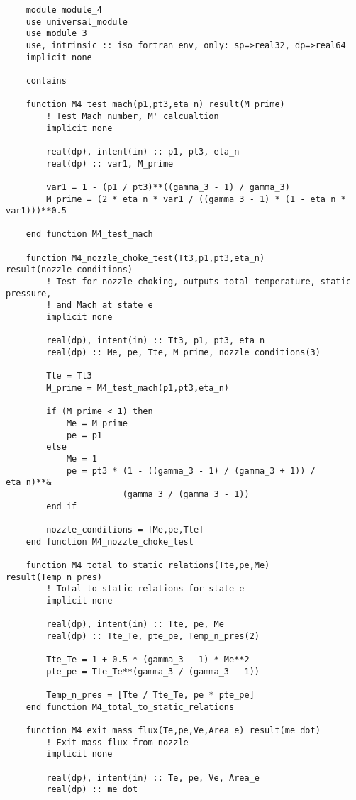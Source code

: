 \begin{verbatim}
    module module_4
    use universal_module
    use module_3
    use, intrinsic :: iso_fortran_env, only: sp=>real32, dp=>real64
    implicit none

    contains

    function M4_test_mach(p1,pt3,eta_n) result(M_prime)
        ! Test Mach number, M' calcualtion
        implicit none

        real(dp), intent(in) :: p1, pt3, eta_n
        real(dp) :: var1, M_prime

        var1 = 1 - (p1 / pt3)**((gamma_3 - 1) / gamma_3)
        M_prime = (2 * eta_n * var1 / ((gamma_3 - 1) * (1 - eta_n * var1)))**0.5

    end function M4_test_mach

    function M4_nozzle_choke_test(Tt3,p1,pt3,eta_n) result(nozzle_conditions)
        ! Test for nozzle choking, outputs total temperature, static pressure,
        ! and Mach at state e
        implicit none

        real(dp), intent(in) :: Tt3, p1, pt3, eta_n
        real(dp) :: Me, pe, Tte, M_prime, nozzle_conditions(3)

        Tte = Tt3
        M_prime = M4_test_mach(p1,pt3,eta_n)

        if (M_prime < 1) then
            Me = M_prime
            pe = p1
        else
            Me = 1
            pe = pt3 * (1 - ((gamma_3 - 1) / (gamma_3 + 1)) / eta_n)**& 
                       (gamma_3 / (gamma_3 - 1))
        end if

        nozzle_conditions = [Me,pe,Tte]
    end function M4_nozzle_choke_test

    function M4_total_to_static_relations(Tte,pe,Me) result(Temp_n_pres)
        ! Total to static relations for state e
        implicit none

        real(dp), intent(in) :: Tte, pe, Me
        real(dp) :: Tte_Te, pte_pe, Temp_n_pres(2)

        Tte_Te = 1 + 0.5 * (gamma_3 - 1) * Me**2
        pte_pe = Tte_Te**(gamma_3 / (gamma_3 - 1))

        Temp_n_pres = [Tte / Tte_Te, pe * pte_pe]
    end function M4_total_to_static_relations

    function M4_exit_mass_flux(Te,pe,Ve,Area_e) result(me_dot)
        ! Exit mass flux from nozzle
        implicit none

        real(dp), intent(in) :: Te, pe, Ve, Area_e
        real(dp) :: me_dot


\end{verbatim}
